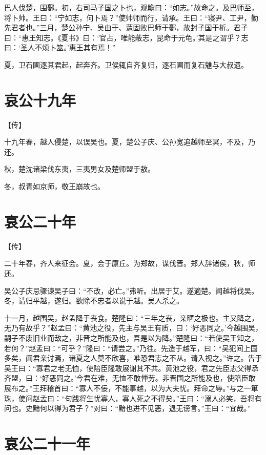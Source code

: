 \documentclass[a4paper,12pt,UTF8,twoside]{ctexbook}
\begin{document}
巴人伐楚，围鄾。初，右司马子国之卜也，观瞻曰：“如志。”故命之。及巴师至，将卜帅。王曰：“宁如志，何卜焉？”使帅师而行，请承。王曰：“寝尹、工尹，勤先君者也。”三月，楚公孙宁、吴由于、薳固败巴师于鄾，故封子国于析。君子曰：“惠王知志。《夏书》曰：‘官占，唯能蔽志，昆命于元龟。’其是之谓乎？志曰：‘圣人不烦卜筮。’惠王其有焉！”

夏，卫石圃逐其君起，起奔齐。卫侯辄自齐复归，逐石圃而复石魋与大叔遗。


\section{哀公十九年}


【传】

十九年春，越人侵楚，以误吴也。夏，楚公子庆、公孙宽追越师至冥，不及，乃还。

秋，楚沈诸梁伐东夷，三夷男女及楚师盟于敖。

冬，叔青如京师，敬王崩故也。



\section{哀公二十年}


【传】

二十年春，齐人来征会。夏，会于廪丘。为郑故，谋伐晋。郑人辞诸侯，秋，师还。

吴公子庆忌骤谏吴子曰：“不改，必亡。”弗听。出居于艾。遂適楚。闻越将伐吴。冬，请归平越，遂归。欲除不忠者以说于越。吴人杀之。

十一月，越围吴，赵孟降于丧食。楚隆曰：“三年之丧，亲暱之极也。主又降之，无乃有故乎？”赵孟曰：“黄池之役，先主与吴王有质，曰：‘好恶同之。’今越围吴，嗣子不废旧业而敌之，非晋之所能及也，吾是以为降。”楚隆曰：“若使吴王知之，若何？”赵孟曰：“可乎？”隆曰：“请尝之。”乃往。先造于越军，曰：“吴犯间上国多矣，闻君亲讨焉，诸夏之人莫不欣喜，唯恐君志之不从。请入视之。”许之。告于吴王曰：“寡君之老无恤，使陪臣隆敢展谢其不共。黄池之役，君之先臣志父得承齐盟，曰：‘好恶同之。’今君在难，无恤不敢惮劳。非晋国之所能及也，使陪臣敢展布之。”王拜稽首曰：“寡人不佞，不能事越，以为大夫忧。拜命之辱。”与之一箪珠，使问赵孟曰：“句践将生忧寡人，寡人死之不得矣。”王曰：“溺人必笑，吾将有问也。史黯何以得为君子？”对曰：“黯也进不见恶，退无谤言。”王曰：“宜哉。”


\section{哀公二十一年}
\end{document}
